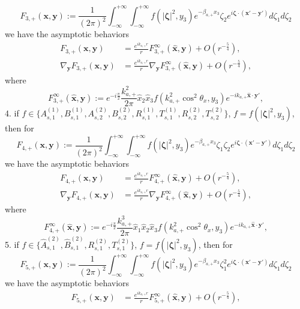 \documentclass[final,reqno]{siamltex}
\begin{document}
\begin{theorem}
  $$
  F_{3,+}(\mathbf{x},\mathbf{y}):=\frac{1}{(2\pi)^2}\int_{-\infty}^{+\infty}\int_{-\infty}^{+\infty}f(|\boldsymbol{\zeta}|^2,y_3)e^{-\beta_{a,+}x_3}\zeta_2e^{i\boldsymbol{\zeta}\cdot(\mathbf{x}'-\mathbf{y}')}d\zeta_1d\zeta_2
  $$
  we have the asymptotic behaviors 
  \begin{align*}
  F_{3,+}(\mathbf{x},\mathbf{y})&=\frac{e^{ik_{a,+}r}}{r}F_{3,+}^\infty(\hat{\mathbf{x}},\mathbf{y})+O(r^{-\frac{5}{4}}), \\ 
  \nabla_{\mathbf{y}}F_{3,+}(\mathbf{x},\mathbf{y})&=\frac{e^{ik_{a,+}r}}{r}\nabla_{\mathbf{y}}F_{3,+}^\infty(\hat{\mathbf{x}},\mathbf{y})+O(r^{-\frac{5}{4}}), 
  \end{align*}
  where 
  $$
  F_{3,+}^\infty(\hat{\mathbf{x}},\mathbf{y}):=e^{-i\frac{\pi}{2}}\frac{k_{a,+}^2}{2\pi}\hat x_2\hat x_3f(k_{a,+}^2\cos^2\theta_x,y_3)e^{-ik_{a,+}\hat{\mathbf{x}}\cdot\mathbf{y}'}, 
  $$
  4. if $f\in\{A_{s,1}^{(1)},B_{s,1}^{(1)},A_{s,2}^{(2)},B_{s,2}^{(2)},R_{s,1}^{(1)},T_{s,1}^{(1)},R_{s,2}^{(2)},T_{s,2}^{(2)}\}$, $f=f(|\boldsymbol{\zeta}|^2,y_3)$,  then for 
  $$
  F_{4,+}(\mathbf{x},\mathbf{y}):=\frac{1}{(2\pi)^2}\int_{-\infty}^{+\infty}\int_{-\infty}^{+\infty}f(|\boldsymbol{\zeta}|^2,y_3)e^{-\beta_{a,+}x_3}\zeta_1\zeta_2e^{i\boldsymbol{\zeta}\cdot(\mathbf{x}'-\mathbf{y}')}d\zeta_1d\zeta_2
  $$
  we have the asymptotic behaviors 
  \begin{align*}
  F_{4,+}(\mathbf{x},\mathbf{y})&=\frac{e^{ik_{a,+}r}}{r}F_{4,+}^\infty(\hat{\mathbf{x}},\mathbf{y})+O(r^{-\frac{5}{4}}), \\ 
  \nabla_{\mathbf{y}}F_{4,+}(\mathbf{x},\mathbf{y})&=\frac{e^{ik_{a,+}r}}{r}\nabla_{\mathbf{y}}F_{4,+}^\infty(\hat{\mathbf{x}},\mathbf{y})+O(r^{-\frac{5}{4}}), 
  \end{align*}
  where 
  $$
  F_{4,+}^\infty(\hat{\mathbf{x}},\mathbf{y}):=e^{-i\frac{\pi}{2}}\frac{k_{a,+}^3}{2\pi}\hat x_1\hat x_2\hat x_3f(k_{a,+}^2\cos^2\theta_x,y_3)e^{-ik_{a,+}\hat{\mathbf{x}}\cdot\mathbf{y}'}, 
  $$
  5. if $f\in\{\hat A_{s,1}^{(2)},\hat B_{s,1}^{(2)},R_{s,1}^{(2)},T_{s,1}^{(2)}\}$, $f=f(|\boldsymbol{\zeta}|^2,y_3)$,  then for 
  $$
  F_{5,+}(\mathbf{x},\mathbf{y}):=\frac{1}{(2\pi)^2}\int_{-\infty}^{+\infty}\int_{-\infty}^{+\infty}f(|\boldsymbol{\zeta}|^2,y_3)e^{-\beta_{a,+}x_3}\zeta_1^2e^{i\boldsymbol{\zeta}\cdot(\mathbf{x}'-\mathbf{y}')}d\zeta_1d\zeta_2
  $$
  we have the asymptotic behaviors 
  \begin{align*}
  F_{5,+}(\mathbf{x},\mathbf{y})&=\frac{e^{ik_{a,+}r}}{r}F_{5,+}^\infty(\hat{\mathbf{x}},\mathbf{y})+O(r^{-\frac{5}{4}}), \\ 

\end{align*}
\end{theorem}
\end{document}
